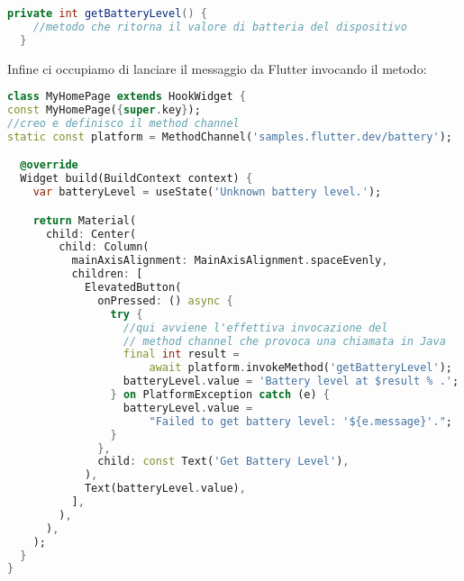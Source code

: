 \begin{appendices}
\begin{lstlisting}[language=Java, firstnumber=1,caption={Java \textit{main activity}}]
  private int getBatteryLevel() {
    //metodo che ritorna il valore di batteria del dispositivo
  }
\end{lstlisting}

Infine ci occupiamo di lanciare il messaggio da Flutter invocando il metodo:

\begin{lstlisting}[language=dart, firstnumber=1,caption={Dart \textit{main}}]
class MyHomePage extends HookWidget {
const MyHomePage({super.key});
//creo e definisco il method channel
static const platform = MethodChannel('samples.flutter.dev/battery');

  @override
  Widget build(BuildContext context) {
    var batteryLevel = useState('Unknown battery level.');

    return Material(
      child: Center(
        child: Column(
          mainAxisAlignment: MainAxisAlignment.spaceEvenly,
          children: [
            ElevatedButton(
              onPressed: () async {
                try {
                  //qui avviene l'effettiva invocazione del
                  // method channel che provoca una chiamata in Java
                  final int result =
                      await platform.invokeMethod('getBatteryLevel');
                  batteryLevel.value = 'Battery level at $result % .';
                } on PlatformException catch (e) {
                  batteryLevel.value =
                      "Failed to get battery level: '${e.message}'.";
                }
              },
              child: const Text('Get Battery Level'),
            ),
            Text(batteryLevel.value),
          ],
        ),
      ),
    );
  }
}
\end{lstlisting}

\end{appendices}
